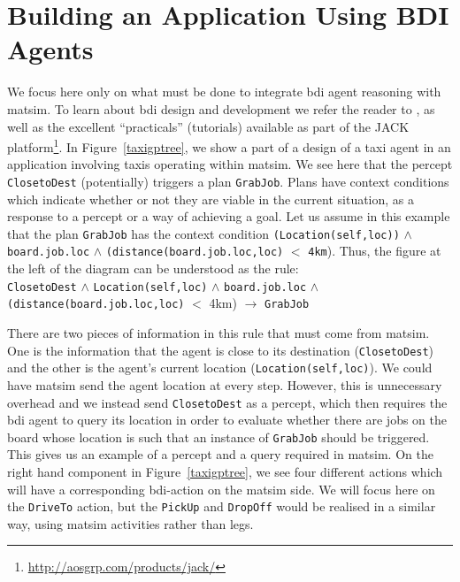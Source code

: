 \section{Building an Application Using BDI Agents}
\label{sec:bdi-usage}
We focus here only on what must be done to integrate  \gls{bdi} agent
reasoning with \gls{matsim}. To learn about \gls{bdi} design and development we
refer the reader to \citet{prometheusbook}, as well as the excellent
``practicals'' (tutorials) available as part of the JACK
platform\footnote{\url{http://aosgrp.com/products/jack/}}. In Figure~\ref{taxigptree}, 
we show a part of a  
design of a taxi agent in an application involving taxis operating
within \gls{matsim}. We see here that the percept \lstinline{ClosetoDest}
(potentially) triggers a plan \lstinline{GrabJob}. Plans have context
conditions which indicate whether or not they are viable in the
current situation, as a response to a percept or a way of achieving a
goal. Let us assume in this example that the plan \lstinline{GrabJob} has
the context condition \lstinline{(Location(self,loc))} $\wedge$ \lstinline{board.job.loc} $\wedge$ \lstinline{(distance(board.job.loc,loc)} $<$
\lstinline{4km}). Thus, the figure at the left of the diagram can be understood as the rule: \\
\lstinline{ClosetoDest} $\wedge$ \lstinline{Location(self,loc)} $\wedge$ \lstinline{board.job.loc} $\wedge$ \lstinline{(distance(board.job.loc,loc)} $<$ 4km) $\rightarrow$ \lstinline{GrabJob} 

There are two pieces of information in this rule that must come from
\gls{matsim}. One is the information that the agent is close to its
destination (\lstinline{ClosetoDest}) and the other is the agent's
current location (\lstinline{Location(self,loc)}).  We could have \gls{matsim}
send the agent location at every step. However, this is unnecessary
overhead and we instead send \lstinline{ClosetoDest} as a percept, which
then requires the \gls{bdi} agent to query its location in order to evaluate
whether there are jobs on the board whose location is such that an
instance of \lstinline{GrabJob} should be triggered.  This gives us an
example of a percept and a query required in \gls{matsim}. On the right hand
component in Figure~\ref{taxigptree}, we see four different actions
which will have a corresponding \gls{bdi}-action on the \gls{matsim} side. We will
focus here on the \lstinline{DriveTo} action, but the \lstinline{PickUp} and
\lstinline{DropOff} would be realised in a similar way, using \gls{matsim}
activities rather than legs.

